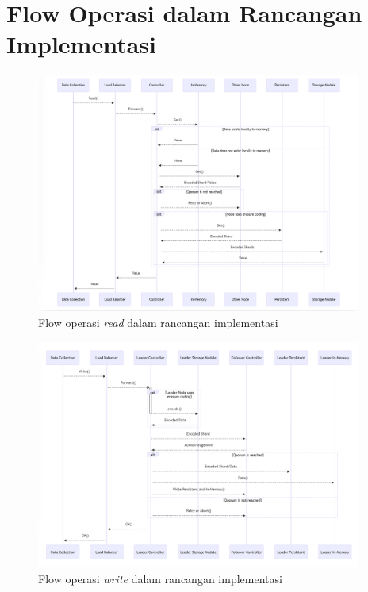 \chapter{Flow Operasi dalam Rancangan Implementasi}
\label{appendix:flow}

\begin{figure}[!h]
    \centering
    \includegraphics[width=0.95\textwidth]{resources/appendix/flow-read-mermaidjs.png}
    \caption{Flow operasi \textit{read} dalam rancangan implementasi}
    \label{fig:flow-read-mermaidjs}
\end{figure}

\begin{figure}[!h]
    \centering
    \includegraphics[width=0.95\textwidth]{resources/appendix/flow-write-mermaidjs.png}
    \caption{Flow operasi \textit{write} dalam rancangan implementasi}
    \label{fig:flow-write-mermaidjs}
\end{figure}

